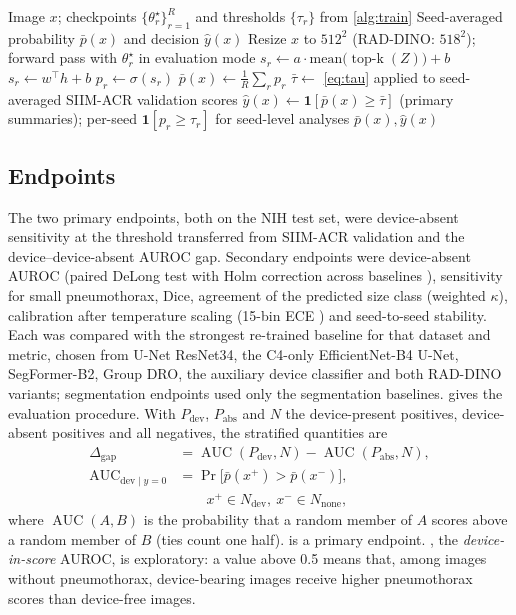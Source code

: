 \documentclass{ieeeaccess}
\DeclareMathOperator*{\topk}{top\text{-}k}
\DeclareMathOperator{\AUC}{AUC}
\begin{document}
\begin{algorithm}[!t]
\caption{Scoring an image with a trained configuration}
\label{alg:score}
\begin{algorithmic}[1]
\Require Image $x$; checkpoints $\{\theta^\star_r\}_{r=1}^{R}$ and thresholds $\{\tau_r\}$ from \cref{alg:train}
\Ensure Seed-averaged probability $\bar p(x)$ and decision $\hat y(x)$
  \State Resize $x$ to $512^2$ (RAD-DINO: $518^2$); forward pass with $\theta^\star_r$ in evaluation mode
   \State $s_r\gets a\cdot\mathrm{mean}\big(\topk(Z)\big)+b$ 
  \Else \State $s_r\gets w^\top h+b$
  \EndIf
  \State $p_r\gets\sigma(s_r)$ 
\EndFor
\State $\bar p(x)\gets\frac1R\sum_r p_r$ 
\State $\bar\tau\gets$ \cref{eq:tau} applied to seed-averaged SIIM-ACR validation scores\label{line:tau-avg}
\State $\hat y(x)\gets\mathbf{1}[\bar p(x)\ge\bar\tau]$ (primary summaries); per-seed $\mathbf{1}[p_r\ge\tau_r]$ for seed-level analyses
\State \Return $\bar p(x),\hat y(x)$
\end{algorithmic}
\end{algorithm}

\subsection{Endpoints}
\label{sec:endpoints}
The two primary endpoints, both on the NIH test set, were device-absent sensitivity at the threshold transferred from SIIM-ACR validation and the device--device-absent AUROC gap. Secondary endpoints were device-absent AUROC (paired DeLong test with Holm correction across baselines \cite{delong1988,holm1979}), sensitivity for small pneumothorax, Dice, agreement of the predicted size class (weighted $\kappa$), calibration after temperature scaling (15-bin ECE \cite{guo2017calibration}) and seed-to-seed stability. Each was compared with the strongest re-trained baseline for that dataset and metric, chosen from U-Net ResNet34, the C4-only EfficientNet-B4 U-Net, SegFormer-B2, Group DRO, the auxiliary device classifier and both RAD-DINO variants; segmentation endpoints used only the segmentation baselines.  gives the evaluation procedure. With $P_{\text{dev}}$, $P_{\text{abs}}$ and $N$ the device-present positives, device-absent positives and all negatives, the stratified quantities are
\begin{align}
\Delta_{\text{gap}} &= \AUC(P_{\text{dev}},N)-\AUC(P_{\text{abs}},N), \label{eq:gap}\\
\AUC_{\text{dev}\mid y=0} &= \Pr\big[\bar p(x^{+})>\bar p(x^{-})\big], \label{eq:devscore}\\
&\qquad x^{+}\in N_{\text{dev}},\ x^{-}\in N_{\text{none}}, \nonumber
\end{align}
where $\AUC(A,B)$ is the probability that a random member of $A$ scores above a random member of $B$ (ties count one half).  is a primary endpoint. , the \emph{device-in-score} AUROC, is exploratory: a value above 0.5 means that, among images without pneumothorax, device-bearing images receive higher pneumothorax scores than device-free images.
\end{document}
